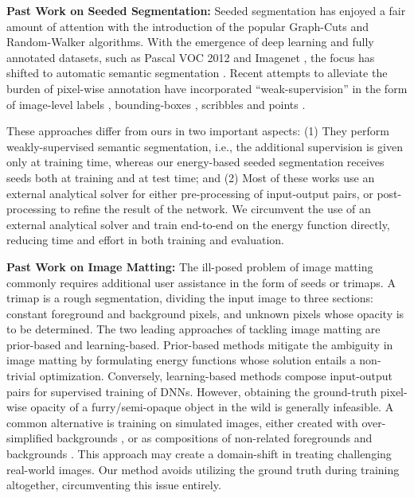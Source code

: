 \documentclass[journal]{IEEEtran}
\newcommand{\smallpar}[1]{\textbf{#1}\hspace{0.2cm}}
\begin{document}
\noindent \smallpar{Past Work on Seeded Segmentation: } 
Seeded segmentation has enjoyed a fair amount of attention with the introduction of the popular Graph-Cuts \cite{classical_seg_1,classical_seg_2} and Random-Walker \cite{random_walker} algorithms. With the emergence of deep learning and fully annotated datasets, such as Pascal VOC 2012 \cite{pascal} and Imagenet \cite{imagenet}, the focus has shifted to automatic semantic segmentation \cite{supervised_segmentation}. Recent attempts to alleviate the burden of pixel-wise annotation have incorporated ``weak-supervision'' in the form of image-level labels \cite{weakly_darrell,seed_expand,stc}, bounding-boxes \cite{weaklysup,boxsup}, scribbles \cite{scribblesup} and points \cite{whats_the_point}. 

These approaches differ from ours in two important aspects: (1) They perform weakly-supervised semantic segmentation, i.e., the additional supervision is given only at training time, whereas our energy-based seeded segmentation receives seeds both at training and at test time; and (2) Most of these works use an external analytical solver for either pre-processing of input-output pairs, or post-processing to refine the result of the network. We circumvent the use of an external analytical solver and train end-to-end on the energy function directly, reducing time and effort in both training and evaluation.

\noindent \smallpar{Past Work on Image Matting: }  
The ill-posed problem of image matting commonly requires additional user assistance in the form of seeds or trimaps. A trimap is a rough segmentation, dividing the input image to three sections: constant foreground and background pixels, and unknown pixels whose opacity is to be determined. The two leading approaches of tackling image matting are prior-based and learning-based. Prior-based methods \cite{closed_form_matting,classic_matting_1,classic_matting_2,classic_matting_3,classic_matting_4,classic_matting_5} mitigate the ambiguity in image matting by formulating energy functions whose solution entails a non-trivial optimization. Conversely, learning-based methods \cite{deep_matting,deep_matting_1,deep_matting_2} compose input-output pairs for supervised training of DNNs. However, obtaining the ground-truth pixel-wise opacity of a furry/semi-opaque object in the wild is generally infeasible. A common alternative is training on simulated images, either created with over-simplified backgrounds \cite{alpha_matting_com}, or as compositions of non-related foregrounds and backgrounds \cite{deep_matting}. This approach may create a domain-shift in treating challenging real-world images. Our method avoids utilizing the ground truth during training altogether, circumventing this issue entirely.
\end{document}
